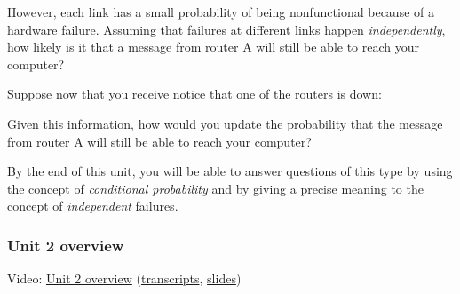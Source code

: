 \documentclass[pdftex, brazil, 12pt, twoside]{article}
\begin{document}
However, each link has a small probability
of being nonfunctional because of a hardware failure.
Assuming that failures at different links
happen \emph{independently}, how likely is it
that a message from router A will still
be able to reach your computer?

Suppose now that you receive notice that one of the routers
is down:

\begin{figure}[H]
  \begin{center}
  \end{center}
\end{figure}

Given this information, how would you
update the probability that the message from router A
will still be able to reach your computer?

By the end of this unit, you will
be able to answer questions of this type
by using the concept of \emph{conditional probability}
and by giving a precise meaning to the concept
of \emph{independent} failures.

\subsubsection{Unit 2 overview}
\label{un2-ovw-ovw}

Video: \href{https://www.youtube.com/watch?v=toHiVQvMWyQ}{Unit 2 overview}
(\href{Unit-2/00\_overview/ovw\_1\_transcripts.pdf}{transcripts},
\href{Unit-2/00\_overview/ovw\_1\_slides.pdf}{slides})
\end{document}
